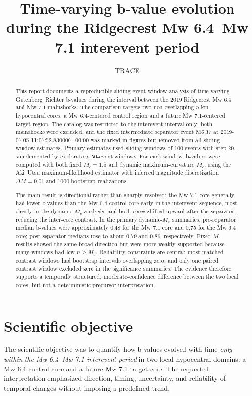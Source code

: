 \documentclass[11pt]{article}
\title{Time-varying b-value evolution during the Ridgecrest Mw 6.4--Mw 7.1 interevent period}
\author{TRACE}
\date{}
\begin{document}
\maketitle

\begin{abstract}
This report documents a reproducible sliding-event-window analysis of time-varying Gutenberg--Richter b-values during the interval between the 2019 Ridgecrest Mw 6.4 and Mw 7.1 mainshocks. The comparison targets two non-overlapping 5 km hypocentral cores: a Mw 6.4-centered control region and a future Mw 7.1-centered target region. The catalog was restricted to the interevent interval only; both mainshocks were excluded, and the fixed intermediate separator event M5.37 at 2019-07-05 11:07:52.830000+00:00 was marked in figures but removed from all sliding-window estimates. Primary estimates used sliding windows of 100 events with step 20, supplemented by exploratory 50-event windows. For each window, b-values were computed with both fixed $M_c=1.5$ and dynamic maximum-curvature $M_c$, using the Aki--Utsu maximum-likelihood estimator with inferred magnitude discretization $\Delta M=0.01$ and 1000 bootstrap realizations.

The main result is directional rather than sharply resolved: the Mw 7.1 core generally had lower b-values than the Mw 6.4 control core early in the interevent sequence, most clearly in the dynamic-$M_c$ analysis, and both cores shifted upward after the separator, reducing the inter-core contrast. In the primary dynamic-$M_c$ summaries, pre-separator median b-values were approximately 0.48 for the Mw 7.1 core and 0.75 for the Mw 6.4 core; post-separator medians rose to about 0.79 and 0.86, respectively. Fixed-$M_c$ results showed the same broad direction but were more weakly supported because many windows had low $n\geq M_c$. Reliability constraints are central: most matched contrast windows had bootstrap intervals overlapping zero, and only one paired contrast window excluded zero in the significance summaries. The evidence therefore supports a temporally structured, moderate-confidence difference between the two local cores, but not a deterministic precursor interpretation.
\end{abstract}

\section{Scientific objective}
The scientific objective was to quantify how b-values evolved with time \emph{only within the Mw 6.4--Mw 7.1 interevent period} in two local hypocentral domains: a Mw 6.4 control core and a future Mw 7.1 target core. The requested interpretation emphasized direction, timing, uncertainty, and reliability of temporal changes without imposing a predefined trend.
\end{document}
